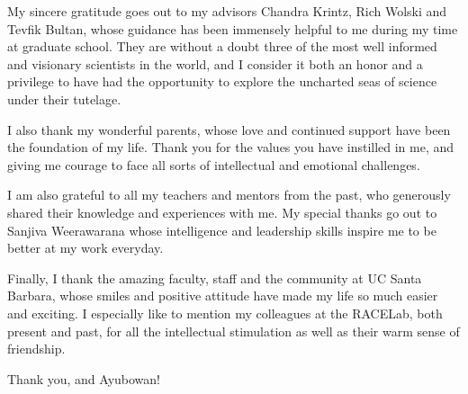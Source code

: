 \begin{acknowledgements}

My sincere gratitude goes out to my advisors Chandra Krintz, Rich Wolski and Tevfik Bultan, whose guidance has been
immensely helpful to me during my time at graduate school. They are without a doubt three of the most well informed
and visionary scientists in the world, and I consider it both an honor and a privilege to have had the opportunity
to explore the uncharted seas of science under their tutelage. 

I also thank my wonderful parents, whose love and continued support have been the foundation of my
life. Thank you for the values you have instilled in me, and giving me courage to face all sorts of
intellectual and emotional challenges. 

I am also grateful to all my teachers and mentors from the past, who generously shared their knowledge
and experiences with me. My special thanks go out to Sanjiva Weerawarana whose intelligence
and leadership skills inspire me to be better at my work everyday. 

Finally, I thank the amazing faculty, staff and the community at UC Santa Barbara, whose smiles and 
positive attitude have made my life so much easier and exciting. I especially like to mention my colleagues
at the RACELab, both present and past, for all the intellectual stimulation as well as their warm sense of
friendship. 

Thank you, and Ayubowan!

\end{acknowledgements} 